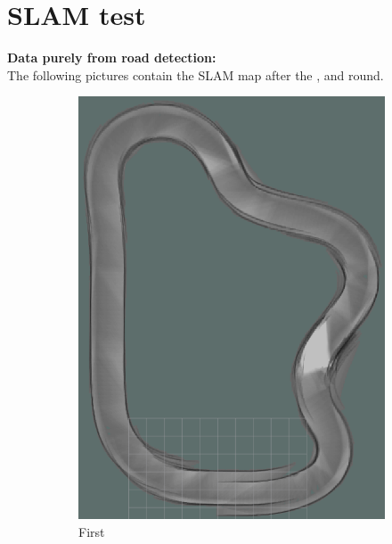 \section{SLAM test}
\textbf{Data purely from road detection:}\\

The following pictures contain the SLAM map after the , and  round.\\

\begin{figure}[H]
	\centering
	\begin{subfigure}{.3\linewidth}
		\includegraphics[width=\textwidth]{Pictures/1slamtest1}
		\caption{First}
		\end{subfigure}	
	\begin{subfigure}{.3\linewidth}

\end{subfigure}
\end{figure}
